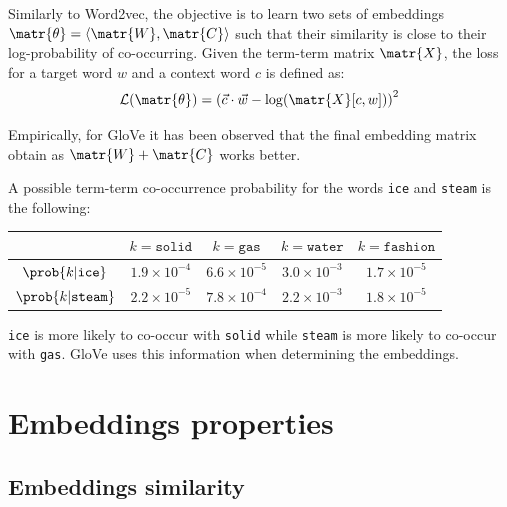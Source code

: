 \begin{description}
        Similarly to Word2vec, the objective is to learn two sets of embeddings $\matr{\theta} = \langle\matr{W}, \matr{C}\rangle$ such that their similarity is close to their log-probability of co-occurring. Given the term-term matrix $\matr{X}$, the loss for a target word $w$ and a context word $c$ is defined as:
        \[ \mathcal{L}(\matr{\theta}) = \left( \vec{c} \cdot \vec{w} - \log( \matr{X}[c, w] ) \right)^2 \]

        \begin{remark}
            Empirically, for GloVe it has been observed that the final embedding matrix obtain as $\matr{W} + \matr{C}$ works better.
        \end{remark}

        \begin{example}
            A possible term-term co-occurrence probability for the words \texttt{ice} and \texttt{steam} is the following:
            \begin{table}[H]
                \centering
                \footnotesize
                \begin{tabular}{ccccc}
                    \toprule
                    & $k=\texttt{solid}$ & $k=\texttt{gas}$ & $k=\texttt{water}$ & $k=\texttt{fashion}$ \\
                    \midrule
                    $\prob{k | \texttt{ice}}$ & $1.9 \times 10^{-4}$ & $6.6 \times 10^{-5}$ & $3.0 \times 10^{-3}$ & $1.7 \times 10^{-5}$ \\
                    $\prob{k | \texttt{steam}}$ & $2.2 \times 10^{-5}$ & $7.8 \times 10^{-4}$ & $2.2 \times 10^{-3}$ & $1.8 \times 10^{-5}$ \\
                    \bottomrule
                \end{tabular}
            \end{table}
            \texttt{ice} is more likely to co-occur with \texttt{solid} while \texttt{steam} is more likely to co-occur with \texttt{gas}. GloVe uses this information when determining the embeddings.
        \end{example}
\end{description}



\section{Embeddings properties}


\subsection{Embeddings similarity}

